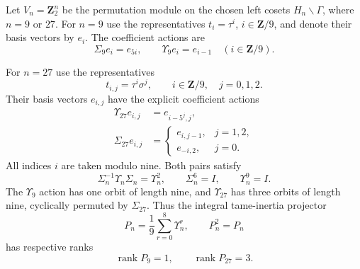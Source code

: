 \begin{theorem}
\label{thm:dyadic-f135-permutation-9-27}
Let $V_n=\mathbf Z_2^n$
be the permutation
module on the chosen
left cosets
$H_n\backslash\Gamma$,
where $n=9$ or $27$.
For $n=9$ use the
representatives
$t_i=\tau^i$,
$i\in\mathbf Z/9$,
and denote their basis
vectors by $e_i$.
The coefficient
actions are
\begin{equation}\label{eq:dyadic-f135-nine-permutations}
\boxed{
\Sigma_9 e_i=e_{5i},
\qquad
\Upsilon_9e_i=e_{i-1}
\quad(i\in\mathbf Z/9).
}
\end{equation}

For $n=27$ use
the representatives
\begin{equation}\label{eq:dyadic-f135-27-coset-representatives}
\boxed{\qquad
t_{i,j}=\tau^i\sigma^j,\qquad
i\in\mathbf Z/9,\quad j=0,1,2.
\qquad}
\end{equation}
Their basis vectors
$e_{i,j}$ have
the explicit
coefficient actions
\begin{equation}\label{eq:dyadic-f135-27-permutations}
\boxed{
\begin{aligned}
\Upsilon_{27}e_{i,j}
 &=e_{i-5^j,j},\\
\Sigma_{27}e_{i,j}
 &=
 \begin{cases}
 e_{i,j-1},&j=1,2,\\
 e_{-i,2},&j=0.
 \end{cases}
\end{aligned}}
\end{equation}
All indices $i$ are
taken modulo nine.
Both pairs satisfy
\begin{equation}\label{eq:dyadic-f135-permutation-tame-relation}
\boxed{
\Sigma_n^{-1}\Upsilon_n\Sigma_n
=\Upsilon_n^2,\qquad
\Sigma_n^6=I,\qquad
\Upsilon_n^9=I.
}
\end{equation}
The $\Upsilon_9$ action
has one orbit of length nine,
and $\Upsilon_{27}$
has three orbits of
length nine, cyclically
permuted by $\Sigma_{27}$.
Thus the integral
tame-inertia projector
\begin{equation}\label{eq:dyadic-f135-odd-inertia-idempotent}
\boxed{\qquad
P_n=\frac19\sum_{r=0}^8\Upsilon_n^r,
\qquad P_n^2=P_n
\qquad}
\end{equation}
has respective ranks
\[
\operatorname{rank}P_9=1,\qquad
\operatorname{rank}P_{27}=3.
\]
\end{theorem}

